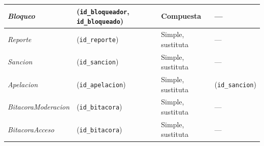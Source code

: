 \begin{center}
\begin{longtable}{|L{0.21\textwidth}|L{0.28\textwidth}|L{0.18\textwidth}|L{0.21\textwidth}|}
\textit{Bloqueo} & (\texttt{id\_\allowbreak{}bloqueador}, \texttt{id\_\allowbreak{}bloqueado}) & Compuesta & --- \\ \hline
\textit{Reporte} & (\texttt{id\_\allowbreak{}reporte}) & Simple, sustituta & --- \\ \hline
\textit{Sancion} & (\texttt{id\_\allowbreak{}sancion}) & Simple, sustituta & --- \\ \hline
\textit{Apelacion} & (\texttt{id\_\allowbreak{}apelacion}) & Simple, sustituta & (\texttt{id\_\allowbreak{}sancion}) \\ \hline
\textit{Bitacora\-Moderacion} & (\texttt{id\_\allowbreak{}bitacora}) & Simple, sustituta & --- \\ \hline
\textit{Bitacora\-Acceso} & (\texttt{id\_\allowbreak{}bitacora}) & Simple, sustituta & --- \\ \hline
\end{longtable}
\end{center}
